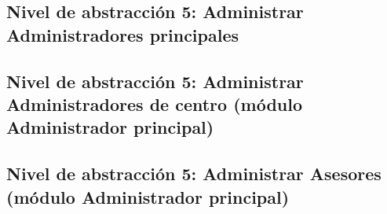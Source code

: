 \subsection{Nivel de abstracción 5: Administrar Administradores principales}



\subsection{Nivel de abstracción 5: Administrar Administradores de centro (módulo Administrador principal)}



\subsection{Nivel de abstracción 5: Administrar Asesores (módulo Administrador principal)}


